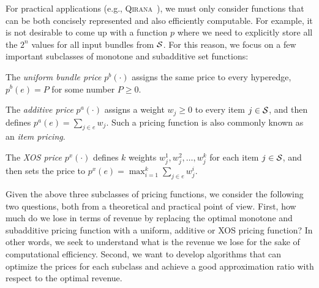 For practical applications (e.g., \textsc{Qirana}~\cite{deep2017qirana}), we must only consider functions that can be both concisely represented and also efficiently computable. For example, it is not desirable to come up with a function $p$ where we need to explicitly store all the $2^n$ values for all input bundles from $\mathcal{S}$.
For this reason, we focus on a few important subclasses of monotone and subadditive set functions:
%
\begin{packed_item}
\item The {\em uniform bundle price}  $p^b(\cdot)$ assigns the same price to every hyperedge, \ie $p^b(e) = P$ for some number $P \geq 0$.
%
\item The {\em additive price} $p^a(\cdot)$ assigns a weight $w_j \geq 0$ to every item $j \in \mathcal{S}$, and then defines
$p^a(e) = \sum_{j \in e} w_j$. Such a pricing function is also commonly known as an {\em item pricing}.
%
\item The {\em XOS price} $p^x(\cdot)$ defines $k$ weights $w_j^1, w_j^2, \dots, w_j^k$ for each item $j \in \mathcal{S}$, and then sets the price to $p^x(e) = \max_{i=1}^k \sum_{j \in e} w_j^i$.
\end{packed_item}

Given the above three subclasses of pricing functions, we consider the following two questions, both from a theoretical and practical point of view.
First, how much do we lose in terms of revenue by replacing the optimal monotone and subadditive pricing function with a uniform, additive or XOS pricing function? In other words, we seek to understand what is the revenue we lose for the sake of computational efficiency.
Second, we want to develop algorithms that can optimize the prices for each subclass and achieve a good approximation ratio with respect to the optimal revenue.


